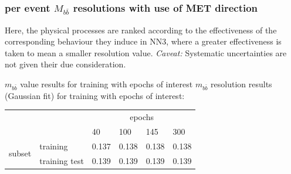 \begin{frame}
\frametitle{per event ${M_{b\bar{b}}}$ resolutions with use of MET direction}
\small Here, the physical processes are ranked according to the effectiveness of the corresponding behaviour they induce in NN3, where a greater effectiveness is taken to mean a smaller resolution value. \emph{Caveat:} Systematic uncertainties are not given their due consideration.
\begin{center}
\end{center}
\end{frame}

\begin{frame}{${m_{b\bar{b}}}$ value results for training with epochs of interest}
${m_{b\bar{b}}}$ resolution results (Gaussian fit) for training with epochs of interest:
\begin{table}[h]
\begin{tabular}{ll|llll|}
\cline{3-6}
&&\multicolumn{4}{c|}{epochs}\\
\cline{3-6}
&&40&100&145&300\\
\hline
\multicolumn{1}{|l|}{\multirow{2}{*}{subset}}	&training&0.137& 0.138&0.138&0.138\\
\multicolumn{1}{|l|}{}							&training test&0.139&0.139&0.139&0.139\\
\hline
\end{tabular}
\end{table}
\end{frame}

